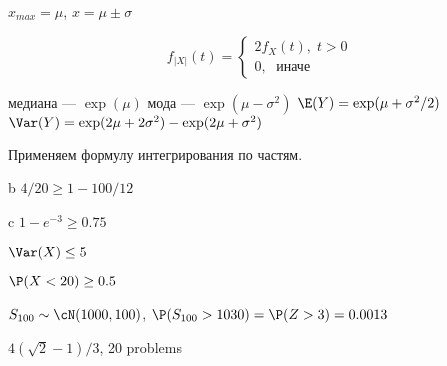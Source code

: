 \begin{solution}{9.2}
\end{solution}
\begin{solution}{9.3}
$x_{max}=\mu$, $x=\mu \pm \sigma$
\end{solution}
\begin{solution}{9.4}
  \[
  f_{|X|}(t) =
  \begin{cases}
  2f_X(t), \; t>0 \\
  0, \; \text{ иначе }
  \end{cases}
  \]
\end{solution}
\begin{solution}{9.5}
  медиана — $\exp(\mu)$
  мода — $\exp(\mu - \sigma^2)$
  $\E(Y)=\exp(\mu+\sigma^2/2)$
  $\Var(Y)=\exp(2\mu + 2\sigma^2)-\exp(2\mu + \sigma^2)$

\end{solution}
\begin{solution}{9.6}
\end{solution}
\begin{solution}{9.7}
  Применяем формулу интегрирования по частям.
\end{solution}
\begin{solution}{10.1}
  b $4/20\geq 1-100/12$

  c $1-e^{-3}\geq 0.75$
\end{solution}
\begin{solution}{10.2}
  $\Var(X)\leq 5$
\end{solution}
\begin{solution}{10.3}
  $\P(X<20) \geq 0.5$
\end{solution}
\begin{solution}{11.1}
\end{solution}
\begin{solution}{11.2}
\end{solution}
\begin{solution}{11.3}
\end{solution}
\begin{solution}{11.4}
  $S_{100} \sim \cN(1000, 100)$, $\P(S_{100}>1030)=\P(Z>3)=0.0013$
\end{solution}
\begin{solution}{11.5}
\end{solution}
\begin{solution}{11.6}
\end{solution}
\begin{solution}{11.7}
\end{solution}
\begin{solution}{11.8}
  $4(\sqrt{2}-1)/3$, 20 problems
\end{solution}
